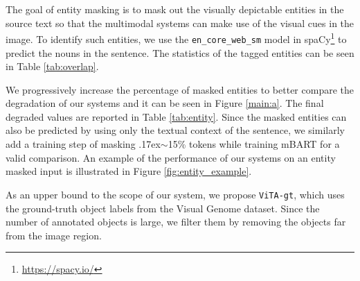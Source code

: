 \documentclass[11pt,a4paper]{article}
\newcommand{\approximately}{{\raise.17ex\hbox{$\scriptstyle\sim$}}}
\begin{document}
 
\begin{table}[t]
\centering
{}
\caption{The effect of entity masking on the BLEU score of the proposed models on the test set.}
\label{tab:entity}
\end{table}
 


The goal of entity masking is to mask out the visually depictable entities in the source text so that the multimodal systems can make use of the visual cues in the image. To identify such entities, we use the \texttt{en\_core\_web\_sm} model in spaCy\footnote{\label{spacyref}\url{https://spacy.io/}} to predict the nouns in the sentence. The statistics of the tagged entities can be seen in Table \ref{tab:overlap}.



We progressively increase the percentage of masked entities to better compare the degradation of our systems and it can be seen in Figure \ref{main:a}.
The final degraded values are reported in Table \ref{tab:entity}. Since the masked entities can also be predicted by using only the textual context of the sentence, we similarly add a training step of masking \approximately15\% tokens while training mBART for a valid comparison. An example of the performance of our systems on an entity masked input is illustrated in Figure \ref{fig:entity_example}.

As an upper bound to the scope of our system, we propose \texttt{ViTA-gt}, which uses the ground-truth object labels from the Visual Genome dataset. Since the number of annotated objects is large, we filter them by removing the objects far from the image region.

\begin{table}[t]
\centering
{}
\caption{The effect of color deprivation on the BLEU score of the proposed models on the test set.}
\label{tab:color}
\end{table}
 
\end{document}
